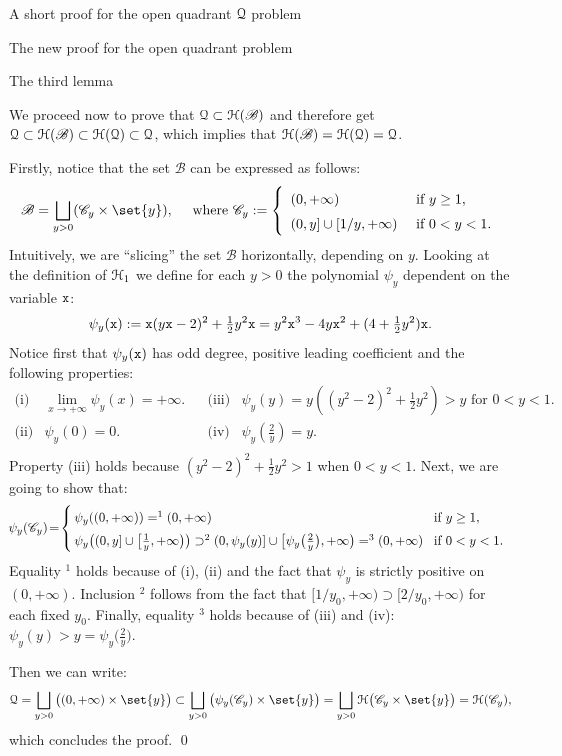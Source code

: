 \documentclass[11pt, a4paper, english, twoside, notitlepage, openright]{report}
\begin{document}
\begin{chapter}{A short proof for the open quadrant $\mathcal{Q}$ problem}
\begin{section}{The new proof for the open quadrant problem}
\begin{subsection}{The third lemma}
\begin{lemma}
\begin{Proof}
\vspace{1mm}

We proceed now to prove that $\mathcal{Q}\subset\mathcal{H}(\mathscr{B})$ and therefore get $\mathcal{Q}\subset\mathcal{H}(\mathscr{B})\subset\mathcal{H}(\mathcal{Q}) \subset\mathcal{Q}$, which implies that $\mathcal{H}(\mathscr{B})=\mathcal{H}(\mathcal{Q})=\mathcal{Q}$.

Firstly, notice that the set $\mathscr{B}$ can be expressed as follows:
$$
\mathscr{B}=\bigsqcup_{y>0}(\mathscr{C}_y\times\set{y}),\quad\text{ where } \mathscr{C}_y:= 
\left\{
\begin{array}{ll}
(0,+\infty)&\text{ if } y \ge 1,\\
(0,y]\cup[1/y,+\infty) & \text { if } 0<y<1.
\end{array}
\right.
$$
Intuitively, we are ``slicing'' the set $\mathscr{B}$ horizontally, depending on $y$. Looking at the definition of $\mathcal{H}_1$ we define for each $y>0$ the polynomial $\psi_y$ dependent on the variable ${\tt x}$:
$$
\psi_y({\tt x}):={\tt x}(y{\tt x}-2)^2+\tfrac{1}{2}y^2{\tt x}=y^2{\tt x}^3-4y{\tt x}^2+(4+\tfrac{1}{2}y^2){\tt x}.
$$
Notice first that $\psi_y({\tt x})$ has odd degree, positive leading coefficient and the following properties:
$$
\begin{array}{llcll}
\text{(i)}&\lim_{x\rightarrow+\infty}\psi_y(x)=+\infty. & &
\text{(iii)}&\psi_y(y)=y((y^2-2)^2+\tfrac{1}{2}y^2)>y\text{ for } 0<y<1.\\
\text{(ii)}&\psi_y(0)=0. & &
\text{(iv)}&\psi_y\left(\tfrac{2}{y}\right)=y.\\
\end{array}
$$
Property (iii) holds because $(y^2-2)^2+\tfrac{1}{2}y^2>1$ when $0<y<1$. Next, we are going to show that:
$$
\!\psi_y(\mathscr{C}_y) \!=\!
\left\{ \def\arraystretch{1.5}
\begin{array}{ll} 
\! \! \psi_y((0,+\infty))=^1(0,+\infty) & \!\!\! \text{ if } y \ge 1,\\
\! \! \psi_y\big((0,y]\cup \big[\frac{1}{y}, +\infty\big)\big) \supset^2 (0, \psi_y(y)] \cup \big[\psi_y\big(\tfrac{2}{y}\big),+\infty\big)=^3(0,+\infty)& \!\!\! \text{ if } 0<y<1.
\end{array}
\right.
$$
Equality $^1$ holds because of (i), (ii) and the fact that $\psi_y$ is strictly positive on $(0, +\infty)$. Inclusion $^2$  follows from the fact that $[1/y_0,+\infty)\supset[2/y_0,+\infty)$ for each fixed $y_0$. Finally, equality $^3$ holds because of (iii) and (iv): $\psi_y(y) > y = \psi_y\big(\tfrac{2}{y}\big)$.

Then we can write:
$$
\Qu=\bigsqcup_{y>0}\big((0,+\infty)\times\set{y}\big)\subset \bigsqcup_{y>0}\big(\psi_y(\mathscr{C}_y)\times\set{y}\big)= \bigsqcup_{y>0}\HH\big(\mathscr{C}_y\times\set{y}\big)=\HH(\mathscr{C}_y),
$$
which concludes the proof.
\qed
\end{Proof}
\end{lemma}
\end{subsection}


\end{section}
\end{chapter}
\end{document}
